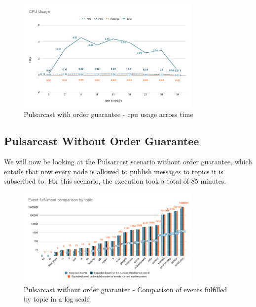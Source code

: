 \begin{figure}[!htb]
  \centering
  \includegraphics[width=0.8\textwidth]{../images/graph-pulsarcast-order-cpu.png}
  \caption{Pulsarcast with order guarantee - \acrshort{cpu} usage across time}
  \label{fig:graph-pulsarcast-order-cpu}
\end{figure}

\subsection{Pulsarcast Without Order Guarantee}\label{subsec:pulsarcast-without-order-guarantee}

We will now be looking at the Pulsarcast scenario without order guarantee,
which entails that now every node is allowed to publish messages to topics it
is subscribed to. For this scenario, the execution took a total of 85 minutes.

\begin{figure}[!htb]
  \centering
  \includegraphics[width=0.8\textwidth]{../images/graph-pulsarcast-event-fulfillment-comparison.png}
  \caption{Pulsarcast without order guarantee - Comparison of events fulfilled by topic in a log scale}
  \label{fig:graph-pulsarcast-event-fulfillment-comparison}
\end{figure}

